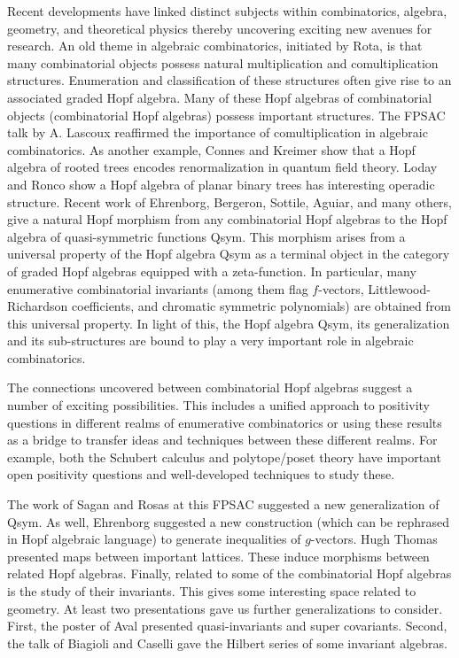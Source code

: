 \documentclass{amsart}
\begin{document}
Recent developments have linked distinct subjects within combinatorics,
algebra, geometry, and theoretical physics thereby uncovering exciting new
avenues for research. An old theme in algebraic combinatorics, initiated by
Rota, is that many combinatorial objects possess natural multiplication and
comultiplication structures. Enumeration and classification of these
structures often give rise to an associated graded Hopf algebra. Many of
these Hopf algebras of combinatorial objects (combinatorial Hopf algebras)
possess important structures. The FPSAC talk by
A. Lascoux reaffirmed
the importance of comultiplication in algebraic combinatorics. As another
example, Connes and Kreimer show that a Hopf algebra of rooted trees encodes
renormalization in quantum field theory. Loday and Ronco show a Hopf algebra
of planar binary trees has interesting operadic structure. Recent work of
Ehrenborg, Bergeron, Sottile, Aguiar, and many others, give a natural Hopf
morphism from any combinatorial Hopf algebras to the Hopf algebra of
quasi-symmetric functions Qsym. This morphism arises from a universal
property of the Hopf algebra Qsym as a terminal object in the category of
graded Hopf algebras equipped with a zeta-function. In particular, many
enumerative combinatorial invariants (among them flag $f$-vectors,
Littlewood-Richardson coefficients, and chromatic symmetric polynomials) are
obtained from this universal property. In light of this, the Hopf algebra
Qsym, its generalization and its sub-structures are bound to play a very
important role in algebraic combinatorics.

The connections uncovered between combinatorial Hopf algebras suggest a
number of exciting possibilities. This includes a unified approach to
positivity questions in different realms of enumerative combinatorics or
using these results as a bridge to transfer ideas and techniques between
these different realms. For example, both the Schubert calculus and
polytope/poset theory have important open positivity questions and
well-developed techniques to study these.

The work of Sagan and Rosas at this FPSAC suggested a new generalization of
Qsym. As well, Ehrenborg suggested a new construction (which can be
rephrased in Hopf algebraic language) to generate inequalities of $g$-vectors.
Hugh Thomas presented maps between important lattices. These induce
morphisms between related Hopf algebras. Finally, related to some of the
combinatorial Hopf algebras is the study of their invariants. This gives
some interesting space related to geometry. At least two presentations gave
us further generalizations to consider. First, the poster of Aval presented
quasi-invariants and super covariants. Second, the talk of Biagioli and
Caselli gave the Hilbert series of some invariant algebras.
\end{document}
